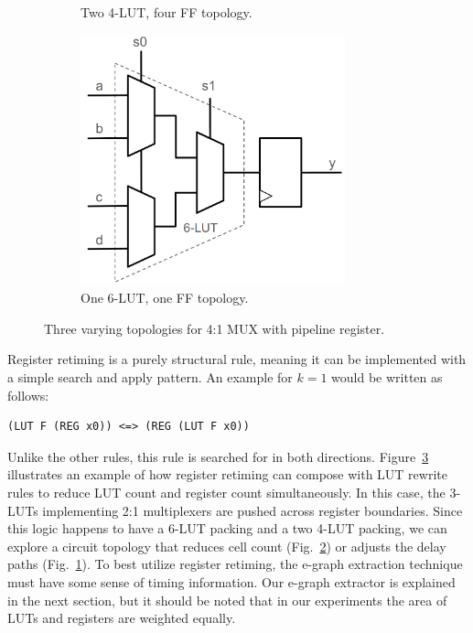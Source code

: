 \begin{figure}[tb]
\begin{subfigure}{0.38\textwidth}
        \caption{Two 4-LUT, four FF topology.}\label{fig:retiming:b}
    \end{subfigure}
    \begin{subfigure}{0.30\textwidth}
        \centering
        \includegraphics[width=0.84\textwidth]{img/mux_4_1_retime.png}
        \caption{One 6-LUT, one FF topology.}\label{fig:retiming:c}
    \end{subfigure}
    \caption{Three varying topologies for 4:1 MUX with pipeline register.}\label{fig:retiming}
\end{figure}

Register retiming is a purely structural rule, meaning it can be implemented
with a simple search and apply pattern. An example for $k=1$ would be written
as follows:

\begin{lstlisting}
(LUT F (REG x0)) <=> (REG (LUT F x0))
\end{lstlisting}

Unlike the other rules, this rule is searched for in both directions.
Figure~\ref{fig:retiming} illustrates an example of how register retiming can
compose with LUT rewrite rules to reduce LUT count and register count
simultaneously. In this case, the 3-LUTs implementing 2:1 multiplexers are
pushed across register boundaries. Since this logic happens to have a 6-LUT
packing and a two 4-LUT packing, we can explore a circuit topology that reduces
cell count (Fig.~\ref{fig:retiming:c}) or adjusts the delay paths
(Fig.~\ref{fig:retiming:b}). To best utilize register retiming, the e-graph
extraction technique must have some sense of timing information. Our e-graph
extractor is explained in the next section, but it should be noted that in our
experiments the area of LUTs and registers are weighted equally.